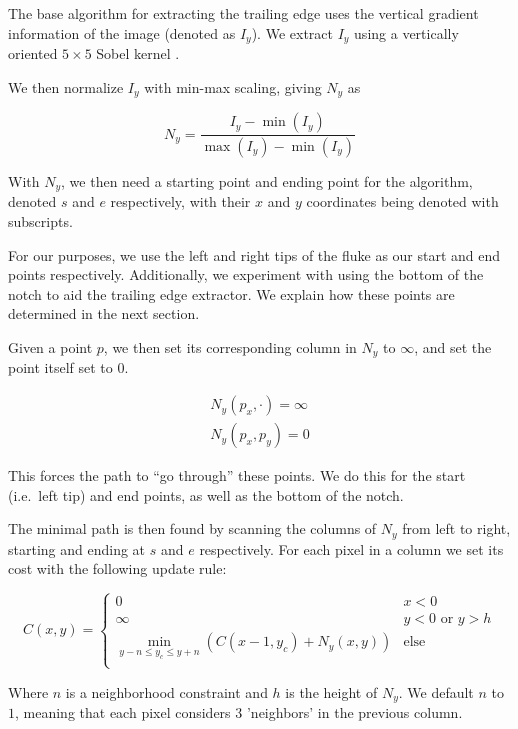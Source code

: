 The base algorithm for extracting the trailing edge uses the vertical gradient information of the image (denoted as $I_y$).
We extract $I_y$ using a vertically oriented $5 \times 5$ Sobel kernel \cite{Sobel1968}.  

We then normalize $I_y$ with min-max scaling, giving $N_y$ as

\begin{equation} \label{eqn:norm01}
N_{y} = \frac{I_y - \min(I_y)}{\max(I_y) - \min(I_y)}
\end{equation}

With $N_y$, we then need a starting point and ending point for the algorithm, denoted $s$ and $e$ respectively, with their $x$ and $y$ coordinates being denoted with subscripts. 

For our purposes, we use the left and right tips of the fluke as our start and end points respectively.
Additionally, we experiment with using the bottom of the notch to aid the trailing edge extractor.
We explain how these points are determined in the next section.

Given a point $p$, we then set its corresponding column in $N_y$ to $\infty$, and set the point itself set to $0$. 

\begin{align} \label{eqn:te_setup}
N_y(p_x,\cdot) = \infty \\
N_y(p_x,p_y) = 0
\end{align}

This forces the path to ``go through'' these points. 
We do this for the start (i.e.\ left tip) and end points, as well as the bottom of the notch. 

The minimal path is then found by scanning the columns of $N_y$ from left to right, starting and ending at $s$ and $e$ respectively. 
For each pixel in a column we set its cost with the following update rule:

\begin{equation} \label{eqn:te_update}
C(x,y) = 
\begin{cases}
	0 & x < 0 \\
	\infty & y < 0 \text{ or } y > h \\
	\min_{y - n \leq y_c \leq y + n}(C(x-1, y_c) + N_y(x,y)) & \text{else} \\
\end{cases}
\end{equation}

Where $n$ is a neighborhood constraint and $h$ is the height of $N_y$.  
We default $n$ to $1$, meaning that each pixel considers $3$ 'neighbors' in the previous column.

